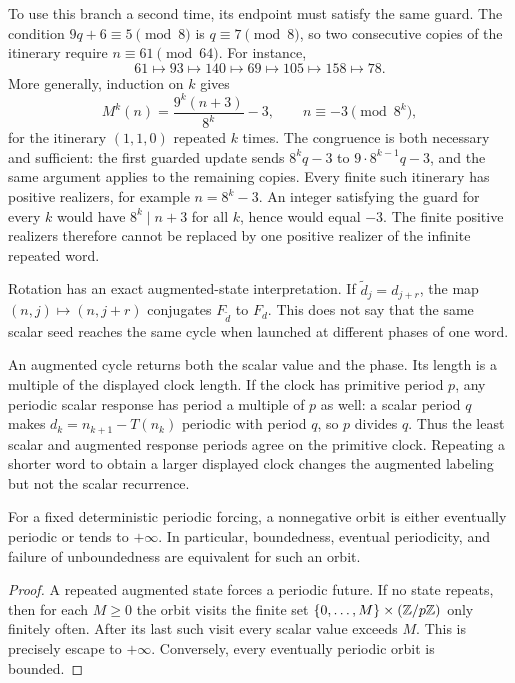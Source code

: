 To use this branch a second time, its endpoint must satisfy the same
guard. The condition $9q+6\equiv5\pmod8$ is $q\equiv7\pmod8$,
so two consecutive copies of the itinerary require
$n\equiv61\pmod{64}$. For instance,
\[
 61\longmapsto93\longmapsto140\longmapsto69
 \longmapsto105\longmapsto158\longmapsto78.
\]
More generally, induction on $k$ gives
\begin{equation}\label{eq:repeated-parity-cylinder}
 M^k(n)=\frac{9^k(n+3)}{8^k}-3,
 \qquad n\equiv-3\pmod{8^k},
\end{equation}
for the itinerary $(1,1,0)$ repeated $k$ times. The congruence is
both necessary and sufficient: the first guarded update sends
$8^kq-3$ to $9\cdot8^{k-1}q-3$, and the same argument applies
to the remaining copies. Every finite such itinerary has positive
realizers, for example $n=8^k-3$. An integer satisfying the guard
for every $k$ would have $8^k\mid n+3$ for all $k$, hence would
equal $-3$. The finite positive realizers therefore cannot be
replaced by one positive realizer of the infinite repeated word.

Rotation has an exact augmented-state interpretation. If
$\widetilde d_j=d_{j+r}$, the map $(n,j)\mapsto(n,j+r)$ conjugates
$F_{\widetilde d}$ to $F_d$. This does not say that the same scalar
seed reaches the same cycle when launched at different phases of
one word.

An augmented cycle returns both the scalar value and the phase. Its
length is a multiple of the displayed clock length. If the clock has
primitive period $p$, any periodic scalar response has period a
multiple of $p$ as well: a scalar period $q$ makes
$d_k=n_{k+1}-T(n_k)$ periodic with period $q$, so $p$ divides $q$.
Thus the least scalar and augmented response periods agree on the
primitive clock. Repeating a shorter word to obtain a larger displayed
clock changes the augmented labeling but not the scalar recurrence.

\begin{proposition}
\label{prop:nonnegative-dichotomy}
For a fixed deterministic periodic forcing, a nonnegative orbit is
either eventually periodic or tends to $+\infty$. In particular,
boundedness, eventual periodicity, and failure of unboundedness are
equivalent for such an orbit.
\end{proposition}
\begin{proof}
A repeated augmented state forces a periodic future. If no state
repeats, then for each $M\ge0$ the orbit visits the finite set
$\{0,\ldots,M\}\times(\mathbb Z/p\mathbb Z)$ only finitely often. After its last
such visit every scalar value exceeds $M$. This is precisely escape
to $+\infty$. Conversely, every eventually periodic orbit is bounded.
\end{proof}
